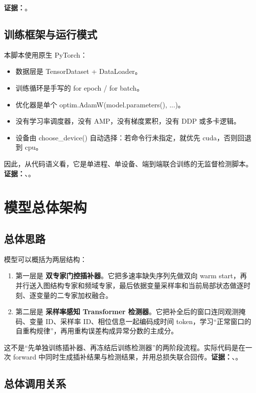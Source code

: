 \documentclass[11pt,a4paper]{ctexart}
\newcommand{\code}[1]{{\ttfamily\small #1}}
\newcommand{\evidence}[1]{\textbf{证据：}#1}
\begin{document}
\evidence{。}

\subsection{训练框架与运行模式}

本脚本使用原生 PyTorch：
\begin{itemize}
  \item 数据层是 \code{TensorDataset + DataLoader}。
  \item 训练循环是手写的 \code{for epoch} / \code{for batch}。
  \item 优化器是单个 \code{optim.AdamW(model.parameters(), ...)}。
  \item 没有学习率调度器，没有 AMP，没有梯度累积，没有 DDP 或多卡逻辑。
  \item 设备由 \code{choose\_device()} 自动选择：若命令行未指定，就优先 \code{cuda}，否则回退到 \code{cpu}。
\end{itemize}

因此，从代码语义看，它是单进程、单设备、端到端联合训练的无监督检测脚本。\evidence{、。}

\section{模型总体架构}

\subsection{总体思路}

模型可以概括为两层结构：
\begin{enumerate}
  \item 第一层是 \textbf{双专家门控插补器}。它把多速率缺失序列先做双向 warm start，再并行送入图结构专家和频域专家，最后依据变量采样率和当前局部状态做逐时刻、逐变量的二专家加权融合。
  \item 第二层是 \textbf{采样率感知 Transformer 检测器}。它把补全后的窗口连同观测掩码、变量 ID、采样率 ID、相位信息一起编码成时间 token，学习“正常窗口的自重构规律”，再用重构误差构成异常分数的主成分。
\end{enumerate}

这不是“先单独训练插补器、再冻结后训练检测器”的两阶段流程。实际代码是在一次 forward 中同时生成插补结果与检测结果，并用总损失联合回传。\evidence{、。}

\subsection{总体调用关系}
\end{document}
